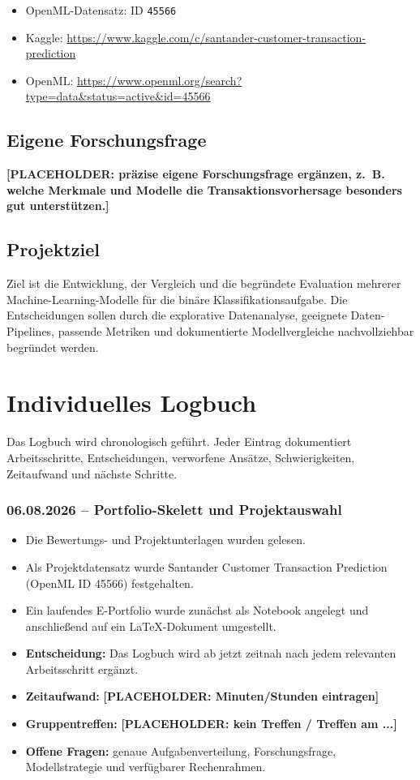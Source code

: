 \documentclass[11pt,a4paper]{article}
\newcommand{\placeholder}[1]{\textcolor{ADAgold}{\textbf{[PLACEHOLDER: #1]}}}
\newcommand{\logentry}[2]{\subsubsection*{#1 – #2}}
\begin{document}
\begin{itemize}
  \item OpenML-Datensatz: ID \texttt{45566}
  \item Kaggle: \url{https://www.kaggle.com/c/santander-customer-transaction-prediction}
  \item OpenML: \url{https://www.openml.org/search?type=data\&status=active\&id=45566}
\end{itemize}

\subsection{Eigene Forschungsfrage}
\placeholder{präzise eigene Forschungsfrage ergänzen, z.~B. welche Merkmale und Modelle
die Transaktionsvorhersage besonders gut unterstützen.}

\subsection{Projektziel}
Ziel ist die Entwicklung, der Vergleich und die begründete Evaluation mehrerer
Machine-Learning-Modelle für die binäre Klassifikationsaufgabe. Die Entscheidungen sollen
durch die explorative Datenanalyse, geeignete Daten-Pipelines, passende Metriken und
dokumentierte Modellvergleiche nachvollziehbar begründet werden.

\section{Individuelles Logbuch}
Das Logbuch wird chronologisch geführt. Jeder Eintrag dokumentiert Arbeitsschritte,
Entscheidungen, verworfene Ansätze, Schwierigkeiten, Zeitaufwand und nächste Schritte.

\logentry{06.08.2026}{Portfolio-Skelett und Projektauswahl}
\begin{itemize}
  \item Die Bewertungs- und Projektunterlagen wurden gelesen.
  \item Als Projektdatensatz wurde Santander Customer Transaction Prediction
        (OpenML ID 45566) festgehalten.
  \item Ein laufendes E-Portfolio wurde zunächst als Notebook angelegt und anschließend
        auf ein LaTeX-Dokument umgestellt.
  \item \textbf{Entscheidung:} Das Logbuch wird ab jetzt zeitnah nach jedem relevanten
        Arbeitsschritt ergänzt.
  \item \textbf{Zeitaufwand:} \placeholder{Minuten/Stunden eintragen}
  \item \textbf{Gruppentreffen:} \placeholder{kein Treffen / Treffen am ...}
  \item \textbf{Offene Fragen:} genaue Aufgabenverteilung, Forschungsfrage,
        Modellstrategie und verfügbarer Rechenrahmen.
\end{itemize}
\end{document}

